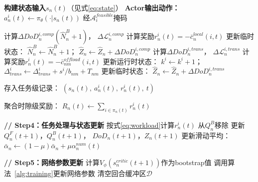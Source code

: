 \documentclass[a4paper,11pt]{article}
\begin{document}
\begin{algorithm}[t]
\begin{algorithmic}[1]
                \STATE \textbf{构建状态输入}$s_n(t)$（见式\eqref{eq:state}）
                \STATE \textbf{Actor输出动作：}
                       $a^i_n(t) \leftarrow \pi_\theta(\cdot|s_n(t))$
                       经$\mathcal{A}^{feasible}_i$掩码

                    \STATE 计算$\Delta DoD^{i,comp}_n(\hat{N}^B_n+1)$，
                           $\Delta\mathcal{L}^{i,comp}_n$
                    \STATE 计算奖励$r^i_n(t) =
                           -\bar{c}^{local}_n(i,t)$
                    \STATE 更新临时状态：
                           $\hat{N}^B_n \leftarrow \hat{N}^B_n + 1$；
                           $\hat{Z}_n \leftarrow \hat{Z}_n
                           + \Delta DoD^{i,comp}_n$
                \ELSE[$a^i_n(t) = m$，转发给邻居$m$]
                    \STATE 计算$\Delta DoD^{i,trans}_n$，
                           $\Delta\mathcal{L}^{i,trans}_n$
                    \STATE 计算奖励$r^i_n(t) =
                           -\bar{c}^{offload}_{nm}(i,t)$
                    \STATE 更新运行时状态：
                           $k^i \leftarrow k^i + 1$；
                           $\Delta^i_{trans} \leftarrow
                           \Delta^i_{trans} + s^i/b_{nm} + T_{nm}$
                    \STATE 更新临时状态：
                           $\hat{Z}_n \leftarrow \hat{Z}_n
                           + \Delta DoD^{i,trans}_n$
                \ENDIF

                \STATE 存入任务级记录：
                       $(s_n(t),\ a^i_n(t),\ r^i_n(t),\ t)$
            \ENDFOR

            \STATE 聚合时隙级奖励：
                   $R_n(t) \leftarrow \sum_{i \in \pi_n(t)} r^i_n(t)$
        \ENDFOR

        \STATE \textbf{// Step4：任务处理与状态更新}
                \STATE 按式\eqref{eq:workload}计算$r^i_n(t)$
                    \STATE 从$Q^B_n$移除
                \ENDIF
            \ENDFOR
            \STATE 更新$Q^F_n(t+1)$，$Q^B_n(t+1)$，
                   $DoD_n(t+1)$，$Z_n(t+1)$
            \STATE 更新滑动平均：
                   $\bar{\alpha}_n \leftarrow
                   (1-\mu)\bar{\alpha}_n
                   + \mu\alpha^{num}_n(t)$
        \ENDFOR

        \STATE \textbf{// Step5：网络参数更新}
            \STATE 计算$V_\phi(s^{critic}_n(t+1))$作为bootstrap值
            \STATE 调用算法~\ref{alg:training}更新网络参数
            \STATE 清空回合缓冲区$\mathcal{D}$
        \ENDIF

    \ENDFOR
\ENDFOR
\end{algorithmic}
\end{algorithm}
\end{document}
